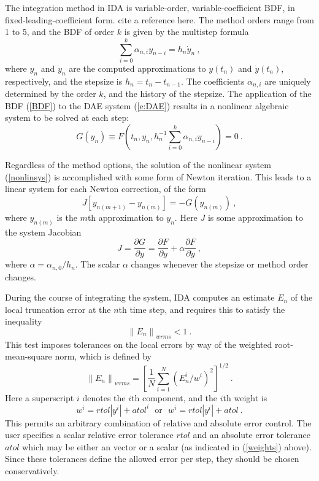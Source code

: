 The integration method in IDA is variable-order, variable-coefficient
BDF, in fixed-leading-coefficient form.  {\sf cite a reference here.} 
The method orders range from 1 to 5, and the BDF of order $k$
is given by the multistep formula
\begin{equation}
\sum_{i=0}^k \alpha_{n,i}y_{n-i} = h_n {\dot y}_n ~,  \label{BDF}
\end{equation}
where $y_n$ and ${\dot y}_n$ are the computed approximations to $y(t_n)$
and ${\dot y}(t_n)$, respectively, and the stepsize is $h_n = t_n - t_{n-1}$.  
The coefficients $\alpha_{n,i}$ are uniquely determined by the order
$k$, and the history of the stepsize.  The application of the BDF
(\ref{BDF}) to the DAE system (\ref{e:DAE}) results in a nonlinear
algebraic system to be solved at each step:
\begin{equation}
G(y_n) \equiv F(t_n, y_n, h_n^{-1} \sum_{i=0}^k \alpha_{n,i}y_{n-i})
       = 0 ~.                                         \label{nonlinsys}
\end{equation}

Regardless of the method options, the solution of the nonlinear system
(\ref{nonlinsys}) is accomplished with some form of Newton iteration.
This leads to a linear system for each Newton correction, of the form
\begin{equation}
J [y_{n(m+1)} - y_{n(m)}] = -G(y_{n(m)})  ~, \label{DAE_Newtoncorr}
\end{equation}
where $y_{n(m)}$ is the $m$th approximation to $y_n$.  Here $J$ is 
some approximation to the system Jacobian
\begin{equation}
J = \frac{\partial G}{\partial y}
  = \frac{\partial F}{\partial y} + \alpha\frac{\partial F}{\partial {\dot y}}
                                                     ~, \label{e:DAE_Jacobian}
\end{equation}
where $\alpha = \alpha_{n,0}/h_n$.  The scalar $\alpha$ changes 
whenever the stepsize or method order changes.

During the course of integrating the system, IDA computes an estimate
$E_n$ of the local truncation error at the $n$th time step, and
requires this to satisfy the inequality
\begin{equation}
  \left\| E_n\right\|_{wrms} < 1 ~.                  \label{Errtest}
\end{equation}
This test imposes tolerances on the local errors by way of the weighted
root-mean-square norm, which is defined by
\[
\left\| E_n\right\|_{wrms} = \left[ \frac{1}{N} \sum_{i=1}^N 
    ( E_n^i / w^i ) ^2 \right] ^{1/2} ~.
\]
Here a superscript $i$ denotes the $i$th component, and the $i$th
weight is 
\begin{equation}
w^i = rtol |y^i| + atol^i ~~~ \mbox{or} ~~~ w^i = rtol |y^i| + atol ~.
                                                    \label{weights}
\end{equation}
This permits an arbitrary combination of relative and absolute error
control. The user specifies a scalar relative error tolerance $rtol$
and an absolute error tolerance $atol$ which may be either an
vector or a scalar (as indicated in (\ref{weights}) above).  
Since these tolerances define the allowed error per step, they should
be chosen conservatively.

